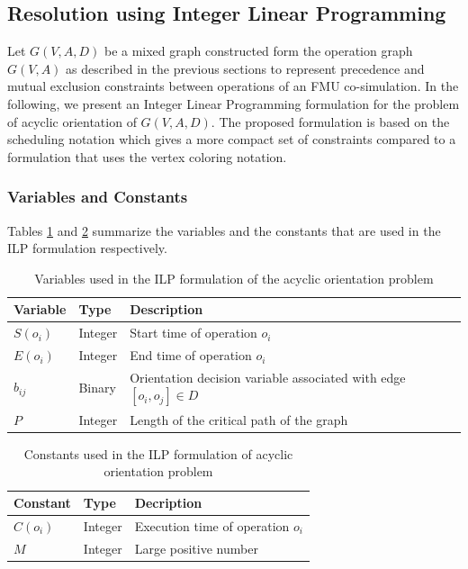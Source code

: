 \subsection{Resolution using Integer Linear Programming}

Let $G(V,A,D)$ be a mixed graph constructed form the operation graph $G(V,A)$ as described in the previous sections to represent precedence and mutual exclusion constraints between operations of an FMU co-simulation. In the following, we present an Integer Linear Programming formulation for the problem of acyclic orientation of $G(V,A,D)$. The proposed formulation is based on the scheduling notation which gives a more compact set of constraints compared to a formulation that uses the vertex coloring notation.

\subsubsection{Variables and Constants}

Tables \ref{table:varilporient} and \ref{table:consilporient} summarize the variables and the constants that are used in the ILP formulation respectively.

\begin{table}[!htbp]
\caption{Variables used in the ILP formulation of the acyclic orientation problem}
\centering
\label{table:varilporient}
\begin{tabular}{l l l}
\toprule
Variable & Type & Description  \\
\midrule
 $S(o_i)$ & Integer & Start time of operation $o_i$\\
 $E(o_i)$ & Integer & End time of operation $o_i$\\
 $b_{ij}$ & Binary & Orientation decision variable associated with edge $[o_i,o_j] \in D$\\
 $P$ & Integer & Length of the critical path of the graph\\
\bottomrule
\end{tabular}
\end{table}

\begin{table}[!htbp]
\caption{Constants used in the ILP formulation of acyclic orientation problem}
\centering
\label{table:consilporient}
\begin{tabular}{l l l}
\toprule
Constant & Type & Decription\\
\midrule
 $C(o_i)$ & Integer & Execution time of operation $o_i$\\
 $M$ & Integer & Large positive number\\
\bottomrule
\end{tabular}
\end{table}

